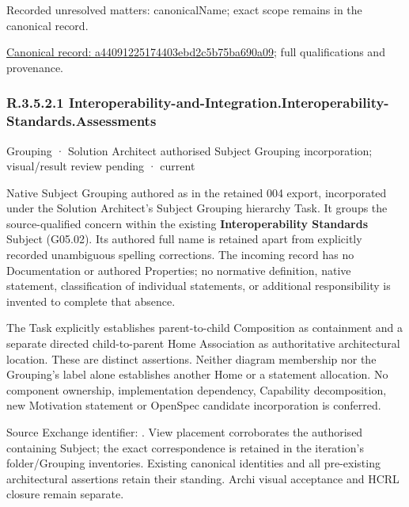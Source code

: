 {\small Recorded unresolved matters: canonicalName; exact scope remains in the canonical record.}\par
{\footnotesize \href{../../../../continuum/grouping/a44091225174403ebd2c5b75ba690a09.md}{Canonical record: a44091225174403ebd2c5b75ba690a09}; full qualifications and provenance.}\par
\subsubsection*{R.3.5.2.1 Interoperability-and-Integration.Interoperability-Standards.Assessments}
\label{navigation:R.3.5.2.1}

\label{element:9020808d1ff9466db08ad2f8c9a97542}
{\small Grouping · Solution Architect authorised Subject Grouping incorporation; visual/result review pending · current}\par

Native Subject Grouping authored as \texttt{} in the retained 004 export,
incorporated under the Solution Architect's Subject Grouping hierarchy Task.
It groups the source-qualified \texttt{} concern within
the existing \textbf{Interoperability Standards} Subject (G05.02). Its authored full name
is retained apart from explicitly recorded unambiguous spelling corrections.
The incoming record has no Documentation or authored Properties; no normative
definition, native statement, classification of individual statements, or
additional responsibility is invented to complete that absence.



The Task explicitly establishes parent-to-child Composition as containment and
a separate directed child-to-parent Home Association as authoritative architectural
location. These are distinct assertions. Neither diagram membership nor the
Grouping's label alone establishes another Home or a statement allocation.
No component ownership, implementation dependency, Capability decomposition,
new Motivation statement or OpenSpec candidate incorporation is conferred.



Source Exchange identifier: \texttt{}. View placement corroborates
the authorised containing Subject; the exact correspondence is retained in the
iteration's folder/Grouping inventories. Existing canonical identities and all
pre-existing architectural assertions retain their standing. Archi visual
acceptance and HCRL closure remain separate.


